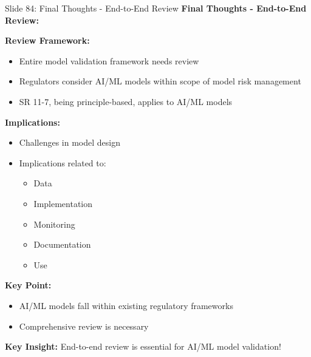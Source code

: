 \documentclass[8pt]{beamer}
\begin{document}
	\begin{frame}{Slide 84: Final Thoughts - End-to-End Review}
		\fontsize{6.5}{7.5}\selectfont
		\textbf{Final Thoughts - End-to-End Review:}
		
		\vspace{0.1cm}
		\textbf{Review Framework:}
		\begin{itemize}
			\item Entire model validation framework needs review
			\item Regulators consider AI/ML models within scope of model risk management
			\item SR 11-7, being principle-based, applies to AI/ML models
		\end{itemize}
		
		\vspace{0.1cm}
		\textbf{Implications:}
		\begin{itemize}
			\item Challenges in model design
			\item Implications related to:
			\begin{itemize}
				\item Data
				\item Implementation
				\item Monitoring
				\item Documentation
				\item Use
			\end{itemize}
		\end{itemize}
		
		\vspace{0.1cm}
		\textbf{Key Point:}
		\begin{itemize}
			\item AI/ML models fall within existing regulatory frameworks
			\item Comprehensive review is necessary
		\end{itemize}
		
		\textcolor{myblue}{\textbf{Key Insight:}} End-to-end review is \textcolor{myblue}{essential for AI/ML model validation}!
	\end{frame}
	
\end{document}
